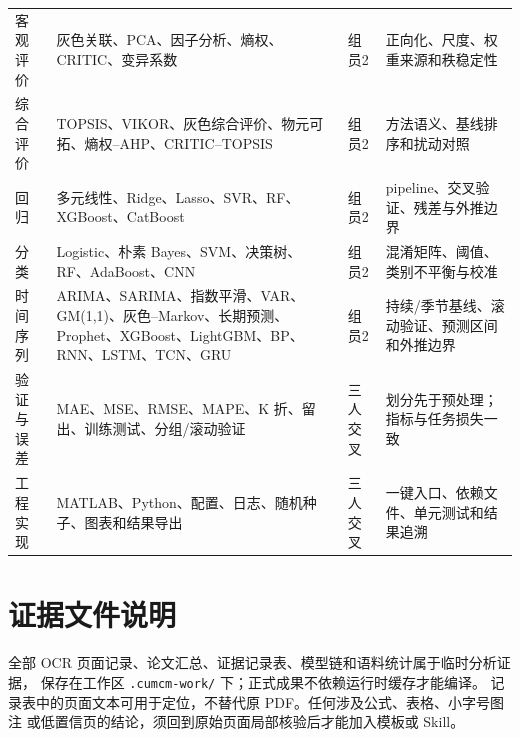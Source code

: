 \documentclass[UTF8,a4paper,12pt]{ctexart}
\begin{document}
\begin{longtable}{p{2.1cm}p{5.0cm}p{2.0cm}p{5.5cm}}
客观评价 & 灰色关联、PCA、因子分析、熵权、CRITIC、变异系数 & 组员2 & 正向化、尺度、权重来源和秩稳定性\\
综合评价 & TOPSIS、VIKOR、灰色综合评价、物元可拓、熵权--AHP、CRITIC--TOPSIS & 组员2 & 方法语义、基线排序和扰动对照\\
回归 & 多元线性、Ridge、Lasso、SVR、RF、XGBoost、CatBoost & 组员2 & pipeline、交叉验证、残差与外推边界\\
分类 & Logistic、朴素 Bayes、SVM、决策树、RF、AdaBoost、CNN & 组员2 & 混淆矩阵、阈值、类别不平衡与校准\\
时间序列 & ARIMA、SARIMA、指数平滑、VAR、GM(1,1)、灰色--Markov、长期预测、Prophet、XGBoost、LightGBM、BP、RNN、LSTM、TCN、GRU & 组员2 & 持续/季节基线、滚动验证、预测区间和外推边界\\
验证与误差 & MAE、MSE、RMSE、MAPE、K 折、留出、训练测试、分组/滚动验证 & 三人交叉 & 划分先于预处理；指标与任务损失一致\\
工程实现 & MATLAB、Python、配置、日志、随机种子、图表和结果导出 & 三人交叉 & 一键入口、依赖文件、单元测试和结果追溯\\
\bottomrule
\end{longtable}

\section{证据文件说明}

全部 OCR 页面记录、论文汇总、证据记录表、模型链和语料统计属于临时分析证据，
保存在工作区 \texttt{.cumcm-work/} 下；正式成果不依赖运行时缓存才能编译。
记录表中的页面文本可用于定位，不替代原 PDF。任何涉及公式、表格、小字号图注
或低置信页的结论，须回到原始页面局部核验后才能加入模板或 Skill。
\end{document}
